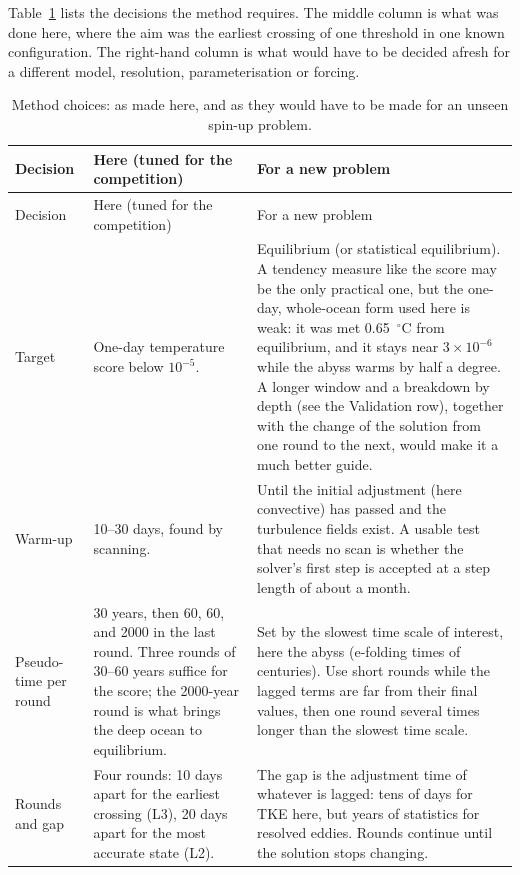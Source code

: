 \documentclass{article}
\begin{document}
Table~\ref{tab:choices} lists the decisions the method requires. The middle column is what was done here, where the aim was the earliest crossing of one threshold in one known configuration. The right-hand column is what would have to be decided afresh for a different model, resolution, parameterisation or forcing.

{\small
\renewcommand{\arraystretch}{1.2}
\begin{longtable}{>{\raggedright\arraybackslash}p{}|p{}|p{}}
\caption{Method choices: as made here, and as they would have to be made for an unseen spin-up problem.}\label{tab:choices}\\
\toprule
Decision & Here (tuned for the competition) & For a new problem \\
\midrule
\endfirsthead
\toprule
Decision & Here (tuned for the competition) & For a new problem \\
\midrule
\endhead
\bottomrule
\endfoot
Target &
One-day temperature score below $10^{-5}$. &
Equilibrium (or statistical equilibrium). A tendency measure like the score may be the only practical one, but the one-day, whole-ocean form used here is weak: it was met 0.65~$^\circ$C from equilibrium, and it stays near $3\times10^{-6}$ while the abyss warms by half a degree. A longer window and a breakdown by depth (see the Validation row), together with the change of the solution from one round to the next, would make it a much better guide. \\[1ex]
Warm-up &
10--30 days, found by scanning. &
Until the initial adjustment (here convective) has passed and the turbulence fields exist. A usable test that needs no scan is whether the solver's first step is accepted at a step length of about a month. \\[1ex]
Pseudo-time per round &
30 years, then 60, 60, and 2000 in the last round. Three rounds of 30--60 years suffice for the score; the 2000-year round is what brings the deep ocean to equilibrium. &
Set by the slowest time scale of interest, here the abyss (e-folding times of centuries). Use short rounds while the lagged terms are far from their final values, then one round several times longer than the slowest time scale. \\[1ex]
Rounds and gap &
Four rounds: 10 days apart for the earliest crossing (L3), 20 days apart for the most accurate state (L2). &
The gap is the adjustment time of whatever is lagged: tens of days for TKE here, but years of statistics for resolved eddies. Rounds continue until the solution stops changing. \\[1ex]

\end{longtable}}
\end{document}
